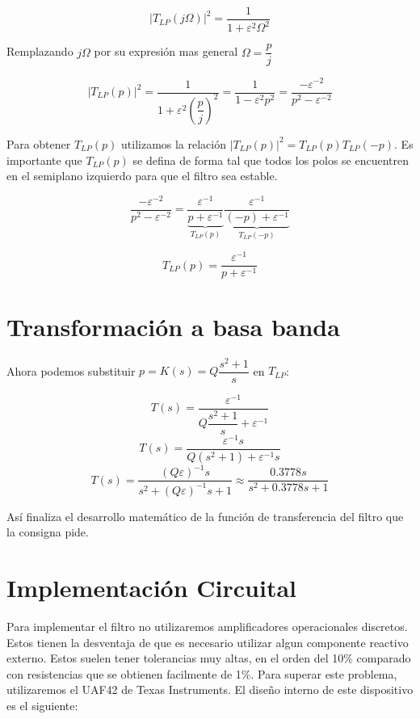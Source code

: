 \documentclass[11pt,a4paper]{report}
\begin{document}
$$|T_{LP}(j\Omega)|^2 = \dfrac{1}{1 + \varepsilon^2 \Omega^2}$$

Remplazando $j\Omega$ por su expresión mas general $\Omega = \dfrac{p}{j}$

$$|T_{LP}(p)|^2 = \dfrac{1}{1 + \varepsilon^2 \left(\dfrac{p}{j}\right)^2} = \dfrac{1}{1 - \varepsilon^2 p^2} = \dfrac{-\varepsilon^{-2}}{p^2 - {\varepsilon^{-2}}}$$

Para obtener $T_{LP}(p)$ utilizamos la relación $|T_{LP}(p)|^2 = T_{LP}(p) T_{LP}(-p)$. Es importante que $T_{LP}(p)$ se defina de forma tal que todos los polos se encuentren en el semiplano izquierdo para que el filtro sea estable.

$$
\dfrac{-\varepsilon^{-2}}{p^2 - {\varepsilon^{-2}}} =
\underbrace{\dfrac{\varepsilon^{-1}}{p + \varepsilon^{-1}}}_{T_{LP}(p)}
\underbrace{\dfrac{\varepsilon^{-1}}{(-p) + \varepsilon^{-1}}}_{T_{LP}(-p)}
$$

$$T_{LP}(p) = \dfrac{\varepsilon^{-1}}{p + \varepsilon^{-1}}$$

\section{Transformación a basa banda}

Ahora podemos substituir $p = K(s) = Q \dfrac{s^2 + 1}{s}$ en $T_{LP}$:

$$T(s) = \dfrac{\varepsilon^{-1}}{Q \dfrac{s^2 + 1}{s} + \varepsilon^{-1}} $$
$$T(s) = \dfrac{\varepsilon^{-1}s}{Q (s^2 + 1) + \varepsilon^{-1}s} $$
$$T(s) = \dfrac{(Q \varepsilon)^{-1}s}{s^2 +  (Q \varepsilon)^{-1}s + 1} \approx \dfrac{0.3778s}{s^2 +  0.3778s + 1}$$

Así finaliza el desarrollo matemático de la función de transferencia del filtro que la consigna pide.

\section{Implementación Circuital}

Para implementar el filtro no utilizaremos amplificadores operacionales discretos. Estos tienen la desventaja de que es necesario utilizar algun componente reactivo externo. Estos suelen tener tolerancias muy altas, en el orden del 10\% comparado con resistencias que se obtienen facilmente de 1\%. Para superar este problema, utilizaremos el UAF42\cite{uaf42} de Texas Instruments. El diseño interno de este dispositivo es el siguiente:
\end{document}
